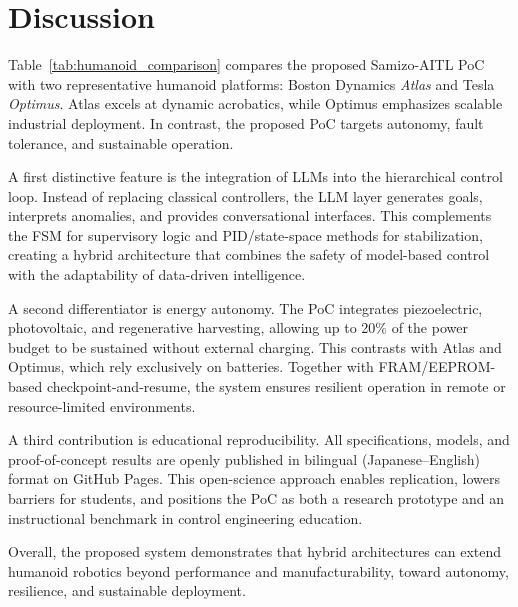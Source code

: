 \section{Discussion}
Table~\ref{tab:humanoid_comparison} compares the proposed Samizo-AITL PoC
with two representative humanoid platforms: Boston Dynamics \textit{Atlas} 
and Tesla \textit{Optimus}.
Atlas excels at dynamic acrobatics, while Optimus emphasizes scalable
industrial deployment. In contrast, the proposed PoC targets autonomy,
fault tolerance, and sustainable operation.

A first distinctive feature is the integration of LLMs into the hierarchical
control loop. Instead of replacing classical controllers, the LLM layer
generates goals, interprets anomalies, and provides conversational interfaces.
This complements the FSM for supervisory logic and PID/state-space methods
for stabilization, creating a hybrid architecture that combines the safety
of model-based control with the adaptability of data-driven intelligence.

A second differentiator is energy autonomy. The PoC integrates
piezoelectric, photovoltaic, and regenerative harvesting,
allowing up to 20\% of the power budget to be sustained
without external charging. This contrasts with Atlas and Optimus,
which rely exclusively on batteries. Together with FRAM/EEPROM-based
checkpoint-and-resume, the system ensures resilient operation
in remote or resource-limited environments.

A third contribution is educational reproducibility.
All specifications, models, and proof-of-concept results are openly published
in bilingual (Japanese–English) format on GitHub Pages.
This open-science approach enables replication, lowers barriers for students,
and positions the PoC as both a research prototype and an instructional
benchmark in control engineering education.

Overall, the proposed system demonstrates that hybrid architectures
can extend humanoid robotics beyond performance and manufacturability,
toward autonomy, resilience, and sustainable deployment.

